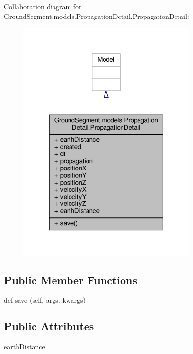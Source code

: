 Collaboration diagram for Ground\+Segment.\+models.\+Propagation\+Detail.\+Propagation\+Detail\+:\nopagebreak
\begin{figure}[H]
\begin{center}
\leavevmode
\includegraphics[width=256pt]{class_ground_segment_1_1models_1_1_propagation_detail_1_1_propagation_detail__coll__graph}
\end{center}
\end{figure}
\subsection*{Public Member Functions}
\begin{DoxyCompactItemize}
\item 
def \hyperlink{class_ground_segment_1_1models_1_1_propagation_detail_1_1_propagation_detail_af4f51f559651a468eee06b81b2fafd98}{save} (self, args, kwargs)
\end{DoxyCompactItemize}
\subsection*{Public Attributes}
\begin{DoxyCompactItemize}
\item 
\hyperlink{class_ground_segment_1_1models_1_1_propagation_detail_1_1_propagation_detail_ad4ca6c25f7f244d098cb060f2b91571e}{earth\+Distance}
\end{DoxyCompactItemize}
